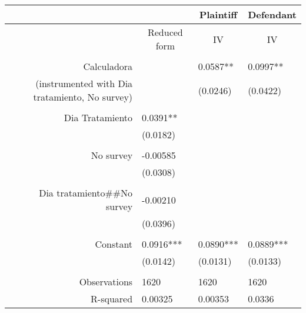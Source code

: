 \begin{tabular}{rrrr}
\toprule
      &       & \multicolumn{1}{c}{Plaintiff} & \multicolumn{1}{c}{Defendant} \\
\midrule
      & \multicolumn{1}{c}{Reduced form} & \multicolumn{1}{c}{IV} & \multicolumn{1}{c}{IV} \\
      & \multicolumn{1}{c}{} & \multicolumn{1}{c}{} & \multicolumn{1}{c}{} \\
Calculadora & \multicolumn{1}{l}{} & \multicolumn{1}{l}{0.0587**} & \multicolumn{1}{l}{0.0997**} \\
 (instrumented with Dia tratamiento, No survey) & \multicolumn{1}{l}{} & \multicolumn{1}{l}{(0.0246)} & \multicolumn{1}{l}{(0.0422)} \\
      & \multicolumn{1}{l}{} & \multicolumn{1}{l}{} & \multicolumn{1}{l}{} \\
Dia Tratamiento & \multicolumn{1}{l}{0.0391**} & \multicolumn{1}{l}{} & \multicolumn{1}{l}{} \\
      & \multicolumn{1}{l}{(0.0182)} & \multicolumn{1}{l}{} & \multicolumn{1}{l}{} \\
      & \multicolumn{1}{l}{} & \multicolumn{1}{l}{} & \multicolumn{1}{l}{} \\
No survey & \multicolumn{1}{l}{-0.00585} & \multicolumn{1}{l}{} & \multicolumn{1}{l}{} \\
      & \multicolumn{1}{l}{(0.0308)} & \multicolumn{1}{l}{} & \multicolumn{1}{l}{} \\
      & \multicolumn{1}{l}{} & \multicolumn{1}{l}{} & \multicolumn{1}{l}{} \\
Dia tratamiento\#\#No survey & \multicolumn{1}{l}{-0.00210} & \multicolumn{1}{l}{} & \multicolumn{1}{l}{} \\
      & \multicolumn{1}{l}{(0.0396)} & \multicolumn{1}{l}{} & \multicolumn{1}{l}{} \\
      & \multicolumn{1}{l}{} & \multicolumn{1}{l}{} & \multicolumn{1}{l}{} \\
Constant & \multicolumn{1}{l}{0.0916***} & \multicolumn{1}{l}{0.0890***} & \multicolumn{1}{l}{0.0889***} \\
      & \multicolumn{1}{l}{(0.0142)} & \multicolumn{1}{l}{(0.0131)} & \multicolumn{1}{l}{(0.0133)} \\
      & \multicolumn{1}{l}{} & \multicolumn{1}{l}{} & \multicolumn{1}{l}{} \\
Observations & \multicolumn{1}{l}{1620} & \multicolumn{1}{l}{1620} & \multicolumn{1}{l}{1620} \\
R-squared & \multicolumn{1}{l}{0.00325} & \multicolumn{1}{l}{0.00353} & \multicolumn{1}{l}{0.0336} \\
\bottomrule
\end{tabular}%
